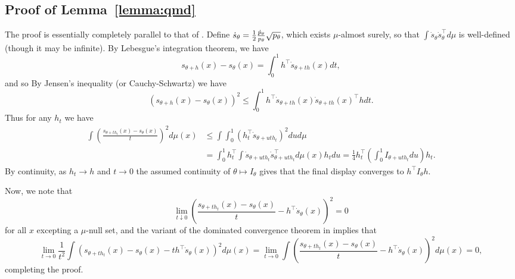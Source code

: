 \subsection{Proof of Lemma~\ref{lemma:qmd}}
\label{sec:proof-qmd}

The proof is essentially completely parallel to that of \cite[Lemma
  7.6]{VanDerVaart98}. Define $\dot{s}_\theta = \frac{1}{2}
\frac{\dot{p}_\theta}{p_\theta} \sqrt{p_\theta}$, which exists $\mu$-almost
surely, so that $\int \dot{s}_\theta \dot{s}_\theta^\top d\mu$ is
well-defined (though it may be infinite). By Lebesgue's integration theorem,
we have
\begin{equation*}
  s_{\theta + h}(x) - s_\theta(x) = \int_0^1 h^\top \dot{s}_{\theta + t h}(x) dt,
\end{equation*}
and so By Jensen's inequality (or Cauchy-Schwartz) we have
\begin{equation*}
  (s_{\theta + h}(x) - s_\theta(x))^2
  \le \int_0^1 h^\top \dot{s}_{\theta + t h}(x)
  \dot{s}_{\theta + t h}(x) ^\top h dt.
\end{equation*}
Thus for any $h_t$ we have
\begin{align*}
  \int \left(\frac{s_{\theta + t h_t}(x) - s_\theta(x)}{t}\right)^2
  d\mu(x)
  & \le \int \int_0^1 (h_t^\top \dot{s}_{\theta + u t h_t})^2 du
  d\mu \\
  & = \int_0^1 h_t^\top \int
  \dot{s}_{\theta + u t h_t}\dot{s}_{\theta + u t h_t}^\top
  d\mu(x) h_t  du
  = \frac{1}{4} h_t^\top \left(\int_0^1 I_{\theta + u t h_t} du\right) h_t.
\end{align*}
By continuity, as $h_t \to h$ and $t \to 0$ the assumed continuity
of $\theta \mapsto I_\theta$ gives that the final display converges
to $h^\top I_\theta h$.

Now, we note that
\begin{equation*}
  \lim_{t \downarrow 0}
  \left(\frac{s_{\theta + t h_t}(x) - s_\theta(x)}{t}
  - h^\top \dot{s}_\theta(x)\right)^2 = 0
\end{equation*}
for all $x$ excepting a $\mu$-null set, and the
variant of the dominated convergence theorem in
\cite[Prop.~2.29]{VanDerVaart98} implies that
\begin{equation*}
  \lim_{t \to 0}
  \frac{1}{t^2}
  \int \left(s_{\theta + t h_t}(x) - s_\theta(x)
  - t h^\top \dot{s}_\theta(x)\right)^2 d\mu(x)
  = \lim_{t \to 0}
  \int \left(\frac{s_{\theta + t h_t}(x) - s_\theta(x)}{t}
  - h^\top \dot{s}_\theta(x)\right)^2 d\mu(x)
  = 0,
\end{equation*}
completing the proof.
